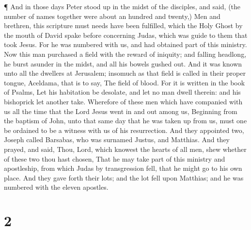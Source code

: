  ¶ And in those days Peter stood up in the midst of the
disciples, and said, (the number of names together were about an hundred
and twenty,)  Men and brethren, this scripture must needs
have been fulfilled, which the Holy Ghost by the mouth of David spake
before concerning Judas, which was guide to them that took Jesus.
 For he was numbered with us, and had obtained part of this
ministry.  Now this man purchased a field with the reward
of iniquity; and falling headlong, he burst asunder in the midst, and
all his bowels gushed out.  And it was known unto all the
dwellers at Jerusalem; insomuch as that field is called in their proper
tongue, Aceldama, that is to say, The field of blood.  For
it is written in the book of Psalms, Let his habitation be desolate, and
let no man dwell therein: and his bishoprick let another take.
 Wherefore of these men which have companied with us all
the time that the Lord Jesus went in and out among us, 
Beginning from the baptism of John, unto that same day that he was taken
up from us, must one be ordained to be a witness with us of his
resurrection.  And they appointed two, Joseph called
Barsabas, who was surnamed Justus, and Matthias.  And they
prayed, and said, Thou, Lord, which knowest the hearts of all men, shew
whether of these two thou hast chosen,  That he may take
part of this ministry and apostleship, from which Judas by transgression
fell, that he might go to his own place.  And they gave
forth their lots; and the lot fell upon Matthias; and he was numbered
with the eleven apostles.

\hypertarget{section-1}{%
\section{2}\label{section-1}}

